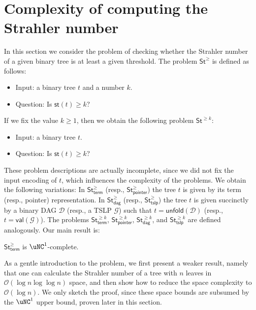 \documentclass[a4paper,UKenglish,cleveref, autoref, thm-restate, numberwithinsect]{lipics-v2021}
\newcommand{\val}{\mathsf{val}}
\newcommand{\hs}{\mathsf{st}}
\newcommand{\unfold}{\mathsf{unfold}}
\newcommand{\StN}{\mathsf{St}^\ge}
\newcommand{\StNk}{\mathsf{St}^{\ge k}}
\newcommand{\StNterm}{\StN_{\mathsf{term}}}
\newcommand{\StNpointer}{\StN_{\mathsf{pointer}}}
\newcommand{\StNkterm}{\StNk_{\mathsf{term}}}
\newcommand{\StNkpointer}{\StNk_{\mathsf{pointer}}}
\newcommand{\StNdag}{\StN_{\mathsf{dag}}}
\newcommand{\StNtslp}{\StN_{\mathsf{tslp}}}
\newcommand{\StNkdag}{\StNk_{\mathsf{dag}}}
\newcommand{\StNktslp}{\StNk_{\mathsf{tslp}}}
\begin{document}
\section{Complexity of computing the Strahler number} \label{sec-compute-st}

In this section we consider the problem of checking whether the Strahler number of a given binary tree is at least a given threshold.
The problem $\StN$ is defined as follows:
\begin{itemize}
\item Input: a binary tree $t$ and a number $k$.
\item Question: Is $\hs(t) \geq k$?
\end{itemize}
If we fix the value $k \geq 1$, then we obtain the following problem $\StNk$:
\begin{itemize}
\item Input: a binary tree $t$.
\item Question: Is $\hs(t) \geq k$?
\end{itemize}
These problem descriptions are actually incomplete, since we did not fix the input encoding of $t$, which influences
the complexity of the problems.
We obtain the following variations: In $\StNterm$ (resp., $\StNpointer$) the tree $t$ is given 
by its term (resp., pointer) representation. In $\StNdag$ (resp., $\StNtslp$) the tree $t$
is given succinctly by a binary DAG $\mathcal{D}$ (resp., a TSLP $\mathcal{G}$) such that $t = \unfold(\mathcal{D})$ (resp., $t = \val(\mathcal{G})$).
The problems $\StNkterm$, $\StNkpointer$, $\StNkdag$, and $\StNktslp$ are defined analogously.
Our main result is:

\begin{theorem} \label{thm-main-NC1}
$\StNterm$ is $\uNC^1$-complete.
\end{theorem}
As a gentle introduction to the problem, we first present a weaker result, namely that one can
calculate the Strahler number of a tree with $n$ leaves in $\mathcal{O}(\log n \log \log n)$ space,
and then show how to reduce the space complexity to $\mathcal{O}(\log n)$.
We only sketch the proof, since these space bounds are subsumed by the $\uNC^1$ upper bound,  proven later in this section.
\end{document}
